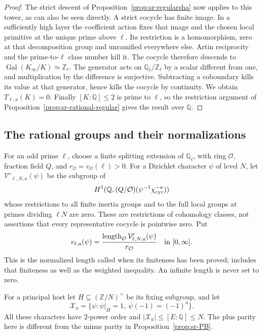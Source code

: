 \begin{proof}
The strict descent of Proposition~\ref{prop:sr-regularsha} now applies
to this tower, as can also be seen directly.
A strict cocycle has finite image. In a sufficiently high layer the
coefficient action fixes that image and the chosen local primitive
at the unique prime above \(\ell\).
Its restriction is a homomorphism, zero at that decomposition group
and unramified everywhere else.
Artin reciprocity and the prime-to-\(\ell\) class number kill it.
The cocycle therefore descends to
\(\operatorname{Gal}(K_\infty/K)\simeq\mathbb Z_\ell\).
The generator acts on \(\mathbb Q_\ell/\mathbb Z_\ell\) by a scalar
different from one, and multiplication by the difference is
surjective. Subtracting a coboundary kills its value at that
generator, hence kills the cocycle by continuity.
We obtain \(T_{\ell,a}(K)=0\).
Finally \([K:\mathbb Q]\leq2\) is prime to \(\ell\), so the
restriction argument of Proposition~\ref{prop:sr-rational-regular}
gives the result over \(\mathbb Q\).
\end{proof}

\subsection{The rational groups and their normalizations}
For an odd prime \(\ell\), choose a finite splitting extension of
\(\mathbb Q_\ell\), with ring \(\mathcal O\), fraction field \(Q\),
and \(r_{\mathcal O}=v_{\mathcal O}(\ell)>0\).
For a Dirichlet character \(\psi\) of level \(N\), let
\(\mathcal V'_{\ell,N,a}(\psi)\) be the subgroup of
\[
 H^1(\mathbb Q,(Q/\mathcal O)(\psi^{-1}\chi_{\rm cyc}^{-a}))
\]
whose restrictions to all finite inertia groups and to the full
local groups at primes dividing \(\ell N\) are zero.
These are restrictions of cohomology classes, not assertions that
every representative cocycle is pointwise zero.
Put
\[
 v_{\ell,a}(\psi)=
 \frac{\operatorname{length}_{\mathcal O}
              \mathcal V'_{\ell,N,a}(\psi)}{r_{\mathcal O}}
                  \quad\hbox{in }[0,\infty].
\]
This is the normalized length called  when its finiteness
has been proved;  includes that finiteness as well as
the weighted inequality. An infinite length is never set to zero.

For a principal host let \(H\subseteq(\mathbb Z/N)^\times\)
be its fixing subgroup, and let
\[
 \mathcal X_a=\{\psi:\psi|_H=1,\ \psi(-1)=(-1)^a\}.
\]
All these characters have \(2\)-power order and
\(|\mathcal X_a|\leq[E:\mathbb Q]\leq N\).
The plus parity here is different from the minus parity in
Proposition~\ref{prop:sr-PB}.

